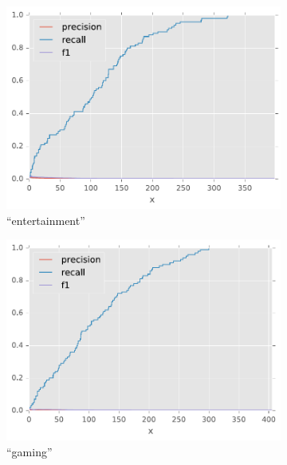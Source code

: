 \begin{figure}[H]
\begin{subfigure}[t]{.4\textwidth}
\centering\includegraphics[]{figures/reddit-entertainment-f1.pdf}
\caption{``entertainment''}
\label{fig-reddit-entertainment-f1}
\end{subfigure}
\begin{subfigure}[t]{.4\textwidth}
\centering\includegraphics[]{figures/reddit-gaming-f1.pdf}
\caption{``gaming''}
\label{fig-reddit-gaming-f1}
\end{subfigure}
\begin{subfigure}[t]{.4\textwidth}

\end{subfigure}
\end{figure}
